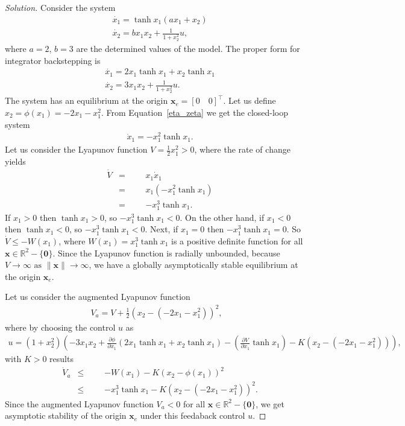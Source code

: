 \documentclass[12pt]{article}
\newenvironment{solution}{\begin{proof}[Solution]}{\end{proof}}
\begin{document}
\begin{solution}
Consider the system
\begin{align*}
&\dot{x_1}= \tanh x_1 (ax_1+x_2) \\
&\dot{x_2}=bx_1x_2+ \frac{1}{1+x_2^2}u,
\end{align*}
where $a=2$, $b=3$ are the determined values of the model. The proper form for integrator backstepping is
\begin{align}\label{eta_zeta}
&\dot{x_1}= 2x_1 \tanh x_1 +x_2 \tanh x_1 \\
&\dot{x_2}=3x_1x_2+ \frac{1}{1+x_2^2}u.
\end{align}
The system has an equilibrium at the origin $\textbf{x}_e=[0 \quad 0]^{\top}$. Let us define $x_2= \phi (x_1)=-2x_1-x_1^2$. From Equation~\ref{eta_zeta} we get the closed-loop system
\begin{align*}
&\dot{x}_1= -x_1^2 \tanh x_1 .
\end{align*}
Let us consider the Lyapunov function $V=\frac{1}{2}x_1^2>0$, where the rate of change yields
\begin{equation*}
\begin{aligned}
& \dot{V}
& = 
&&& x_1\dot{x}_1\\
&&=
&&& x_1(-x_1^2 \tanh x_1)\\
&&=
&&&-x_1^3 \tanh x_1.
\end{aligned}
\end{equation*}
If $x_1>0$ then $\tanh x_1>0$, so $-x_1^3 \tanh x_1<0$. On the other hand, if $x_1<0$ then $\tanh x_1<0$, so $-x_1^3 \tanh x_1<0$. Next, if $x_1=0$ then  $-x_1^3 \tanh x_1=0$. So $\dot{V} \leq -W(x_1)$, where $W(x_1)=x_1^3 \tanh x_1$ is a positive definite function for all $\textbf{x} \in \mathbb{R}^2- \{ \textbf{0} \}$. Since the Lyapunov function is radially unbounded, because $V \rightarrow \infty \mbox{ as } \| \textbf{x}\| \rightarrow \infty$, we have a globally asymptotically stable equilibrium at the origin $\textbf{x}_e$.

Let us consider the augmented Lyapunov function
\begin{align*}
V_a= V +\frac{1}{2}(x_2- (-2x_1-x_1^2))^2,
\end{align*}
where by choosing the control $u$ as
\begin{align}\label{control_u}
u= (1+x_2^2)(-3x_1x_2+ \frac{\partial \phi}{\partial x_1}(2x_1 \tanh x_1 +x_2 \tanh x_1)-(\frac{\partial V}{\partial x_1}\tanh x_1)-K(x_2- (-2x_1-x_1^2))),
\end{align}
with $K>0$ results
\begin{equation*}
\begin{aligned}
& \dot{V}_a
& \leq 
&&& -W(x_1)-K(x_2- \phi(x_1))^2\\
&& \leq
&&& -x_1^3 \tanh x_1 -K(x_2- (-2x_1-x_1^2))^2.
\end{aligned}
\end{equation*}
Since the augmented Lyapunov function $V_a<0$ for all $\textbf{x} \in \mathbb{R}^2- \{ \textbf{0} \}$, we get asymptotic stability of the origin $\textbf{x}_e$ under this feedaback control $u$.


\end{solution}
\end{document}
